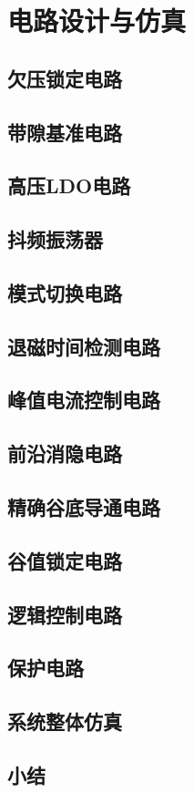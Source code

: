 \chapter{电路设计与仿真}



\section{欠压锁定电路}



\section{带隙基准电路}


\section{高压LDO电路}

\section{抖频振荡器}

\section{模式切换电路}

\section{退磁时间检测电路}

\section{峰值电流控制电路}

\section{前沿消隐电路}

\section{精确谷底导通电路}

\section{谷值锁定电路}

\section{逻辑控制电路}

\section{保护电路}

\section{系统整体仿真}

\section{小结}




